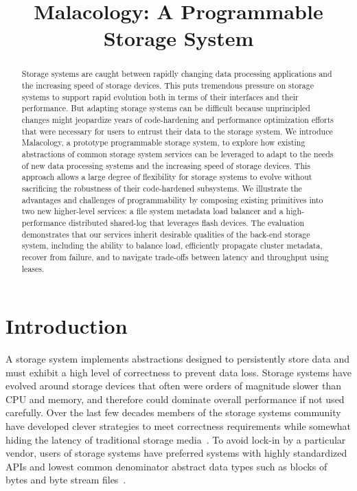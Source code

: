 \documentclass[preprint]{sigplanconf-eurosys}
\title{Malacology: A Programmable Storage System}
\date{}
\begin{document}
\maketitle

\begin{abstract}
Storage systems are caught between rapidly changing data processing
applications and the increasing speed of storage devices. This puts tremendous
pressure on storage systems to support rapid evolution both in terms of their
interfaces and their performance. But adapting storage systems can be difficult
because unprincipled changes might jeopardize years of code-hardening and
performance optimization efforts that were necessary for users to entrust their
data to the storage system.  We introduce  Malacology, a prototype programmable
storage system, to explore how existing abstractions of common storage system services 
can be leveraged to 
adapt to the needs of
new data processing systems and the
increasing speed of storage devices. This approach allows a large degree of
flexibility for storage systems to evolve without sacrificing the robustness of
their code-hardened subsystems.  We illustrate the advantages and challenges of
programmability by composing existing primitives into two new higher-level
services: a file system metadata load balancer and a high-performance
distributed shared-log that leverages flash devices. The evaluation
demonstrates that our services inherit desirable qualities of the back-end
storage system, including the ability to balance load, efficiently propagate
cluster metadata, recover from failure, and to navigate trade-offs between
latency and throughput using leases.
\end{abstract}

\section{Introduction}
\label{introduction}
\label{sec:intro}

A storage system implements abstractions designed to persistently store data
and must exhibit a high level of correctness to prevent data loss.  Storage
systems have evolved around storage devices that often were orders of magnitude
slower than CPU and memory, and therefore could dominate overall performance if
not used carefully. Over the last few decades members of the storage systems
community have developed clever strategies to meet correctness requirements
while somewhat hiding the latency of traditional storage
media~\cite{brewer_disks_2016}. To avoid lock-in by a particular vendor, users
of storage systems have preferred systems with highly standardized APIs and
lowest common denominator abstract data types such as blocks of bytes and byte
stream files~\cite{armbrust_view_2010}.
\end{document}
